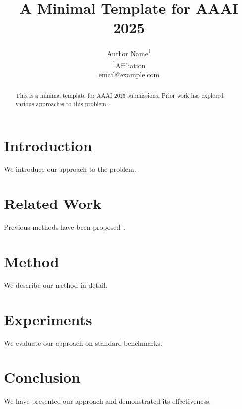 \documentclass[letterpaper]{article}
\title{A Minimal Template for AAAI 2025}
\author{
  Author Name\textsuperscript{\rm 1} \\
  \textsuperscript{\rm 1}Affiliation \\
  email@example.com
}
\begin{document}
\maketitle

\begin{abstract}
This is a minimal template for AAAI 2025 submissions.
Prior work has explored various approaches to this problem~\citep{example2024}.
\end{abstract}

\section{Introduction}
We introduce our approach to the problem.

\section{Related Work}
Previous methods have been proposed~\citep{example2024}.

\section{Method}
We describe our method in detail.

\section{Experiments}
We evaluate our approach on standard benchmarks.

\section{Conclusion}
We have presented our approach and demonstrated its effectiveness.


\end{document}
